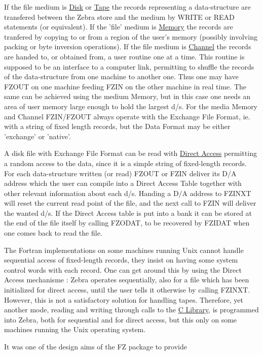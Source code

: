 If the file medium is
\underline{Disk} or \underline{Tape}
the records representing a data-structure are transfered
between the Zebra store and the medium by WRITE or READ statements
(or equivalent).
If the 'file' medium is
\underline{Memory}
the records are tranfered by copying to or from a region
of the user's memory
(possibly involving packing or byte inversion operations).
If the file medium is
\underline{Channel}
the records are handed to, or obtained from,
a user routine one at a time.
This routine is supposed to be an interface to a computer link,
permitting to shuffle the records of the data-structure
from one machine to another one.
Thus one may have FZOUT on one machine feeding FZIN on
the other machine in real time.
The same can be achieved using the medium Memory,
but in this case one needs an area of user memory large enough
to hold the largest d/s.
For the media Memory and Channel FZIN/FZOUT always operate
with the Exchange File Format,
ie. with a string of fixed length records,
but the Data Format may be either 'exchange' or 'native'.
\par
A disk file with Exchange File Format can be read with
\underline{Direct Access}
permitting a random access to the data, since it is a
simple string of fixed-length records.
For each data-structure written (or read) FZOUT or FZIN deliver
its D/A address which the user can compile into a Direct Access Table
together with other relevant information about each d/s.
Handing a D/A address to FZINXT will reset the current read point
of the file, and the next call to FZIN will deliver the wanted d/s.
If the Direct Access table is put into a bank it can be stored
at the end of the file itself by calling FZODAT,
to be recovered by FZIDAT when one comes back to read the file.
\par
The Fortran implementations on some machines running Unix
cannot handle sequential access of fixed-length records,
they insist on having some system control words with each record.
One can get around this by using the Direct Access mechanisme :
Zebra operates sequentially, also for a file which has been
initialized for direct access, until the user tells it otherwise
by calling FZINXT.
However, this is not a satisfactory solution for handling tapes.
Therefore, yet another mode, reading and writing through calls
to the
\underline{C Library}, is programmed into Zebra, both for sequential
and for direct access, but this only on some machines running
the Unix operating system.
\par
It was one of the design aims of the FZ package to provide
